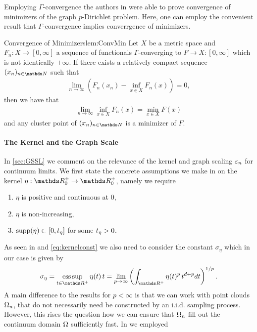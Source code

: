 %
%
Employing $\Gamma$-convergence the authors in \cite{slepcev2019analysis} were able to prove convergence of minimizers of the graph $p$-Dirichlet problem. Here, one can employ the convenient result that $\Gamma$-convergence implies converrgence of minimizers.
%
\begin{lemma}{\cite[Thm. 1.21]{Brad02} Convergence of Minimizers}{lem:ConvMin}
	Let $X$ be a metric space and $F_n:X\rightarrow [0,\infty]$ a sequence of 
	functionals $\Gamma$-converging to $F\rightarrow X:[0,\infty]$ which is not 
	identically $+\infty$. 
	If there exists a relatively compact sequence $(x_n)_{n\in\N}$ such that 
	\begin{align*}
		\lim_{n\rightarrow\infty} \left(F_n(x_n) - \inf_{x\in X} F_n(x)\right) = 0, 
	\end{align*}
	then we have that 
	\begin{align*}
		\lim_{n\rightarrow\infty} \inf_{x\in X} F_n(x) = \min_{x\in X} F(x)
	\end{align*}
	and any cluster point of $(x_n)_{n\in\N}$ is a minimizer of $F$.
\end{lemma}
%
%
\paragraph{The Kernel and the Graph Scale}
%
In \cref{sec:GSSL} we comment on the relevance of the kernel and graph scaling $\varepsilon_n$ for continuum limits. We first state the concrete assumptions we make in \cite{roith2022continuum} on the kernel $\eta:\R_0^+\to\R_0^+$, namely we require

\begin{enumerate}[label=(K\upshape\arabic*)]
\item\label{en:K1} $\eta$ is positive and continuous at $0$,
\item\label{en:K2} $\eta$ is non-increasing,
\item\label{en:K4} $\mathrm{supp}(\eta) \subset [0,t_\eta]$ for some $t_\eta>0$.
\end{enumerate}
%
As seen in \cite{GarcSlep15, slepcev2019analysis} and \cref{eq:kernelconst} we also need to consider the constant $\sigma_\eta$ which in our case is given by
%
\begin{align*}
\sigma_\eta = \esssup_{t\in \R^+} \eta(t)\, t =
\lim_{p\to\infty} \left(\int_{\R^+} \eta(t)^p\, t^{d+p} dt\right)^{1/p}.
\end{align*}
%
%
A main difference to the results for $p<\infty$ is that we can work with point clouds $\Omega_n$, that do not necessarily need be constructed by an i.i.d. sampling process. However, this rises the question how we can ensure that $\Omega_n$ fill out the continuum domain $\Omega$ sufficiently fast. In \cite{roith2022continuum} we employed 

